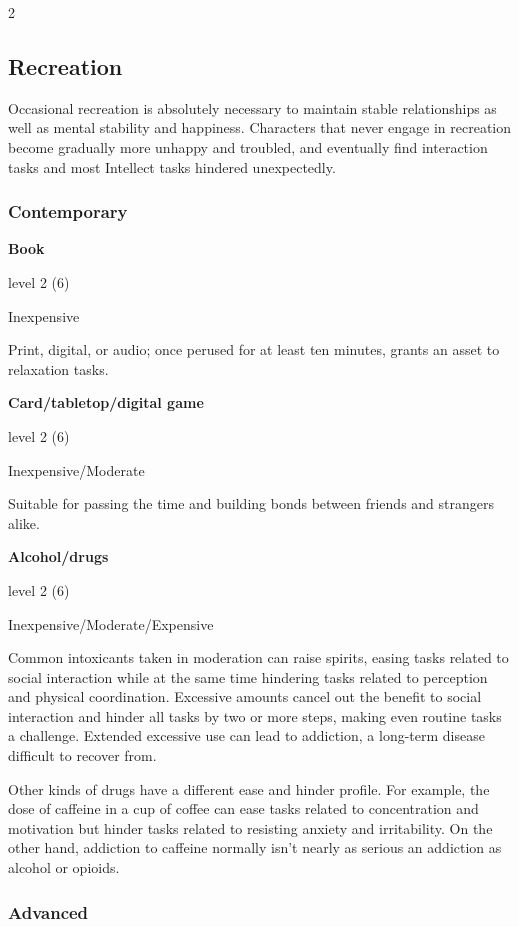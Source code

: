 \begin{multicols}{2}
\subsection{Recreation}

Occasional recreation is absolutely necessary to maintain stable relationships as well as mental stability and happiness. Characters that never engage in recreation become gradually more unhappy and troubled, and eventually find interaction tasks and most Intellect tasks hindered unexpectedly.

\subsubsection{Contemporary}

\textbf{Book} 

level 2 (6) 

Inexpensive 

Print, digital, or audio; once perused for at least ten minutes, grants an asset to relaxation tasks. 

\textbf{Card/tabletop/digital game} 

level 2 (6)

Inexpensive/Moderate 

Suitable for passing the time and building bonds between friends and strangers alike. 

\textbf{Alcohol/drugs} 

level 2 (6) 

Inexpensive/Moderate/Expensive 

Common intoxicants taken in moderation can raise spirits, easing tasks related to social interaction while at the same time hindering tasks related to perception and physical coordination. Excessive amounts cancel out the benefit to social interaction and hinder all tasks by two or more steps, making even routine tasks a challenge. Extended excessive use can lead to addiction, a long-term disease difficult to recover from. 

Other kinds of drugs have a different ease and hinder profile. For example, the dose of caffeine in a cup of coffee can ease tasks related to concentration and motivation but hinder tasks related to resisting anxiety and irritability. On the other hand, addiction to caffeine normally isn’t nearly as serious an addiction as alcohol or opioids.

\subsubsection{Advanced}


\end{multicols}
